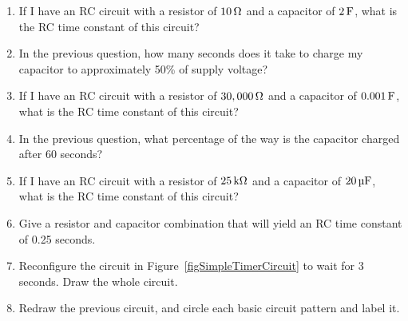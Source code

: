 \applysection

\begin{enumerate}
\item If I have an RC circuit with a resistor of $10\,\si{\ohm}$ and a capacitor of $2\,\si{\farad}$, what is the RC time constant of this circuit?
\item In the previous question, how many seconds does it take to charge my capacitor to approximately 50\% of supply voltage?
\item If I have an RC circuit with a resistor of $30,000\,\si{\ohm}$ and a capacitor of $0.001\,\si{\farad}$, what is the RC time constant of this circuit?
\item In the previous question, what percentage of the way is the capacitor charged after 60 seconds?
\item If I have an RC circuit with a resistor of $25\,\si{\kilo\ohm}$ and a capacitor of $20\,\si{\micro\farad}$, what is the RC time constant of this circuit?
\item Give a resistor and capacitor combination that will yield an RC time constant of 0.25 seconds.
\item Reconfigure the circuit in Figure~\ref{figSimpleTimerCircuit} to wait for 3 seconds.  Draw the whole circuit.
\item Redraw the previous circuit, and circle each basic circuit pattern and label it.
\end{enumerate}

